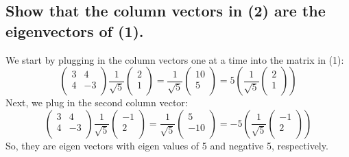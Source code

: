 \documentclass{article}
\begin{document}
\subsection{Show that the column vectors in (2) are the eigenvectors of (1).}
We start by plugging in the column vectors one at a time into the matrix in (1):
\begin{equation}
    \begin{pmatrix}
        3 & 4 \\
        4 & -3 \\
    \end{pmatrix}
\frac{1}{\sqrt{5}}
    \begin{pmatrix}
        2 \\
        1 \\
    \end{pmatrix}
    =
\frac{1}{\sqrt{5}}
    \begin{pmatrix}
        10 \\
        5 \\
    \end{pmatrix}
=
5 \left(\frac{1}{\sqrt{5}}
    \begin{pmatrix}
        2 \\
        1 \\
    \end{pmatrix}
\right)
\end{equation}
Next, we plug in the second column vector:
\begin{equation}
    \begin{pmatrix}
        3 & 4 \\
        4 & -3 \\
    \end{pmatrix}
\frac{1}{\sqrt{5}}
    \begin{pmatrix}
        -1 \\
        2 \\
    \end{pmatrix}
    =
\frac{1}{\sqrt{5}}
    \begin{pmatrix}
        5 \\
        -10 \\
    \end{pmatrix}
=
-5 \left(\frac{1}{\sqrt{5}}
    \begin{pmatrix}
        -1 \\
        2 \\
    \end{pmatrix}
\right)
\end{equation}
So, they are eigen vectors with eigen values of 5 and negative 5, respectively.
\end{document}

